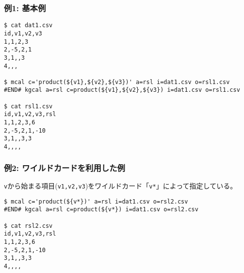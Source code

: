 
\subsubsection*{例1: 基本例}


\begin{Verbatim}[baselinestretch=0.7,frame=single]
$ cat dat1.csv
id,v1,v2,v3
1,1,2,3
2,-5,2,1
3,1,,3
4,,,

$ mcal c='product(${v1},${v2},${v3})' a=rsl i=dat1.csv o=rsl1.csv
#END# kgcal a=rsl c=product(${v1},${v2},${v3}) i=dat1.csv o=rsl1.csv

$ cat rsl1.csv
id,v1,v2,v3,rsl
1,1,2,3,6
2,-5,2,1,-10
3,1,,3,3
4,,,,
\end{Verbatim}

\subsubsection*{例2: ワイルドカードを利用した例}

\verb|v|から始まる項目(\verb|v1,v2,v3|)をワイルドカード「\verb|v*|」によって指定している。

\begin{Verbatim}[baselinestretch=0.7,frame=single]
$ mcal c='product(${v*})' a=rsl i=dat1.csv o=rsl2.csv
#END# kgcal a=rsl c=product(${v*}) i=dat1.csv o=rsl2.csv

$ cat rsl2.csv
id,v1,v2,v3,rsl
1,1,2,3,6
2,-5,2,1,-10
3,1,,3,3
4,,,,
\end{Verbatim}
